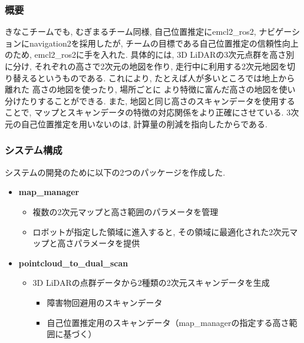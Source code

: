 \subsubsection{概要}

きなこチームでも, むぎまるチーム同様, 
自己位置推定にemcl2\_ros2, ナビゲーションにnavigation2を採用したが, 
チームの目標である自己位置推定の信頼性向上のため, 
emcl2\_ros2に手を入れた. 
具体的には, 3D LiDARの3次元点群を高さ別に分け, 
それぞれの高さで2次元の地図を作り, 
走行中に利用する2次元地図を切り替えるというものである. 
これにより, たとえば人が多いところでは地上から離れた
高さの地図を使ったり, 場所ごとに
より特徴に富んだ高さの地図を使い分けたりすることができる. 
また, 地図と同じ高さのスキャンデータを使用することで, 
マップとスキャンデータの特徴の対応関係をより正確にさせている. 
3次元の自己位置推定を用いないのは, 
計算量の削減を指向したからである. 



\subsubsection{システム構成}
システムの開発のために以下の2つのパッケージを作成した. 

\begin{itemize}
  \item \textbf{map\_manager}
    \begin{itemize}
      \item 複数の2次元マップと高さ範囲のパラメータを管理
      \item ロボットが指定した領域に進入すると, その領域に最適化された2次元マップと高さパラメータを提供
    \end{itemize}
  \item \textbf{pointcloud\_to\_dual\_scan}
    \begin{itemize}
      \item 3D LiDARの点群データから2種類の2次元スキャンデータを生成
        \begin{itemize}
          \item 障害物回避用のスキャンデータ
          \item 自己位置推定用のスキャンデータ（map\_managerの指定する高さ範囲に基づく）
        \end{itemize}
    \end{itemize}
\end{itemize}

